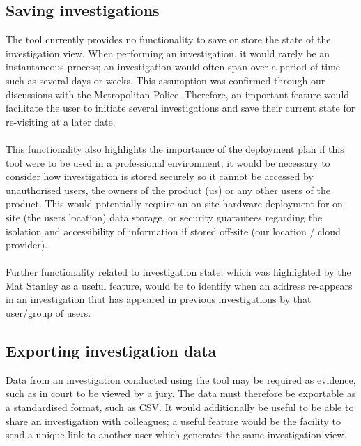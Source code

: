 \subsection{Saving investigations}
The tool currently provides no functionality to save or store the state of the investigation view. When performing an investigation, it would rarely be an instantaneous process; an investigation would often span over a period of time such as several days or weeks. This assumption was confirmed through our discussions with the Metropolitan Police. Therefore, an important feature would facilitate the user to initiate several investigations and save their current state for re-visiting at a later date. 
\\\\
This functionality also highlights the importance of the deployment plan if this tool were to be used in a professional environment; it would be necessary to consider how investigation is stored securely so it cannot be accessed by unauthorised users, the owners of the product (us) or any other users of the product. This would potentially require an on-site hardware deployment for on-site (the users location) data storage, or security guarantees regarding the isolation and accessibility of information if stored off-site (our location / cloud provider). 
\\\\
Further functionality related to investigation state, which was highlighted by the Mat Stanley as a useful feature, would be to identify when an address re-appears in an investigation that has appeared in previous investigations by that user/group of users. 

\subsection{Exporting investigation data}
Data from an investigation conducted using the tool may be required as evidence, such as in court to be viewed by a jury. The data must therefore be exportable as a standardised format, such as CSV. It would additionally be useful to be able to share an investigation with colleagues; a useful feature would be the facility to send a unique link to another user which generates the same investigation view. 

